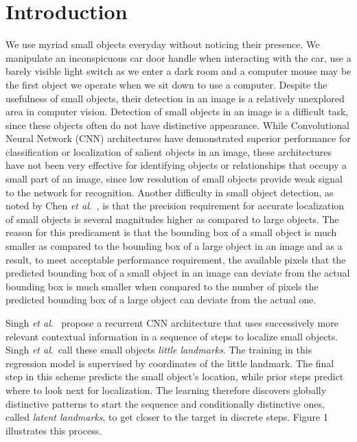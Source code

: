 \documentclass [11pt,letterpaper ,twoside ,openany ]{report}
\begin{document}
    \chapter{Introduction}
    \doublespacing
    We use myriad small objects everyday without noticing their presence. We manipulate an inconspicuous car door handle when interacting with the car, use a barely visible light switch as we enter a dark room and a computer mouse may be the first object we operate when we sit down to use a computer. Despite the usefulness of small objects, their detection in an image is a relatively unexplored area in computer vision. Detection of small objects in an image is a difficult task, since these objects often do not have distinctive appearance. While Convolutional Neural Network (CNN) architectures have demonstrated superior performance for classification or localization of salient objects in an image, these architectures have not been very effective for identifying objects or relationships that occupy a small part of an image, since low resolution of small objects provide weak signal to the network for recognition. Another difficulty in small object detection, as noted by Chen \textit{et al}.\ \cite{chen2016r}, is that the precision requirement for accurate localization of small objects is several magnitudes higher as compared to large objects. The reason for this predicament is that the bounding box of a small object is much smaller as compared to the bounding box of a large object in an image and as a result, to meet acceptable performance requirement, the available pixels that the predicted bounding box of a small object in an image can deviate from the actual bounding box is much smaller when compared to the number of pixels the predicted bounding box of a large object can deviate from the actual one.

    Singh \textit{et al}.\ \cite{Singh_2016_CVPR} propose a recurrent CNN architecture that uses successively more relevant contextual information in a sequence of steps to localize small objects. Singh \textit{et al}.\ call these small objects \textit{little landmarks}. The training in this regression model is supervised by coordinates of the little landmark. The final step in this scheme predicts the small object's location, while prior steps predict where to look next for localization. The learning therefore discovers globally distinctive patterns to start the sequence and conditionally distinctive ones, called \textit {latent landmarks}, to get closer to the target in discrete steps. Figure 1 illustrates this process.
\end{document}
